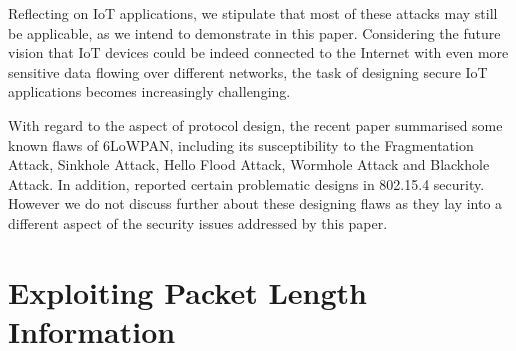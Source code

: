 \documentclass{article}
\begin{document}
Reflecting on IoT applications, we stipulate that most of these attacks may still be applicable, as we intend to demonstrate in this paper. Considering the future vision that IoT devices could be indeed connected to the Internet with even more sensitive data flowing over different networks, the task of designing secure IoT applications becomes increasingly challenging.

With regard to the aspect of protocol design, the recent paper \cite{6LoWPANAtk} summarised some known flaws of 6LoWPAN, including its susceptibility to the Fragmentation Attack\cite{FragAtk}, Sinkhole Attack\cite{Sinkhole}, Hello Flood Attack\cite{HelloFlood}, Wormhole Attack\cite{Wormhole} and Blackhole Attack\cite{Blackhole}. In addition, \cite{802154SecIssues} reported certain problematic designs in 802.15.4 security\cite{802154}. However we do not discuss further about these designing flaws as they lay into a different aspect of the security issues addressed by this paper.




%	





\section{Exploiting Packet Length Information}
\end{document}
